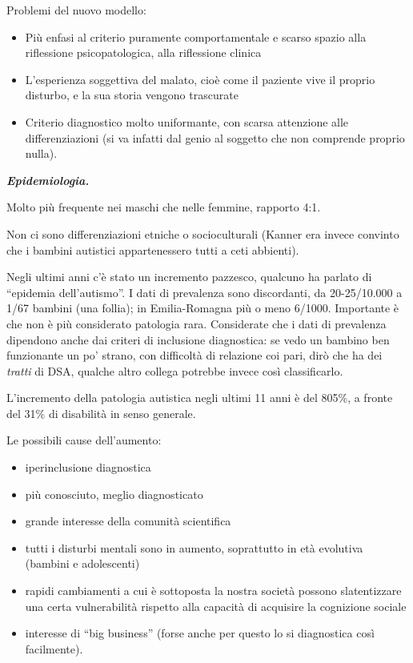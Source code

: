 \documentclass[]{article}
\begin{document}
Problemi del nuovo modello:

\begin{itemize}
\item
  Più enfasi al criterio puramente comportamentale e scarso spazio alla
  riflessione psicopatologica, alla riflessione clinica
\item
  L'esperienza soggettiva del malato, cioè come il paziente vive il
  proprio disturbo, e la sua storia vengono trascurate
\item
  Criterio diagnostico molto uniformante, con scarsa attenzione alle
  differenziazioni (si va infatti dal genio al soggetto che non
  comprende proprio nulla).
\end{itemize}

\emph{\textbf{Epidemiologia.}}

Molto più frequente nei maschi che nelle femmine, rapporto 4:1.

Non ci sono differenziazioni etniche o socioculturali (Kanner era invece
convinto che i bambini autistici appartenessero tutti a ceti abbienti).

Negli ultimi anni c'è stato un incremento pazzesco, qualcuno ha parlato
di ``epidemia dell'autismo''. I dati di prevalenza sono discordanti, da
20-25/10.000 a 1/67 bambini (una follia); in Emilia-Romagna più o meno
6/1000. Importante è che non è più considerato patologia rara.
Considerate che i dati di prevalenza dipendono anche dai criteri di
inclusione diagnostica: se vedo un bambino ben funzionante un po'
strano, con difficoltà di relazione coi pari, dirò che ha dei
\emph{tratti} di DSA, qualche altro collega potrebbe invece così
classificarlo.

L'incremento della patologia autistica negli ultimi 11 anni è del 805\%,
a fronte del 31\% di disabilità in senso generale.

Le possibili cause dell'aumento:

\begin{itemize}
\item
  iperinclusione diagnostica
\item
  più conosciuto, meglio diagnosticato
\item
  grande interesse della comunità scientifica
\item
  tutti i disturbi mentali sono in aumento, soprattutto in età evolutiva
  (bambini e adolescenti)
\item
  rapidi cambiamenti a cui è sottoposta la nostra società possono
  slatentizzare una certa vulnerabilità rispetto alla capacità di
  acquisire la cognizione sociale
\item
  interesse di ``big business'' (forse anche per questo lo si
  diagnostica così facilmente).
\end{itemize}
\end{document}
